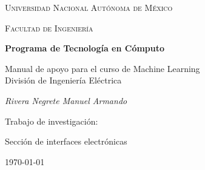 \begin{minipage}{\textwidth}
	\centering
	\vspace{1.5cm}
	\scshape\LARGE Universidad Nacional Autónoma de México \par
	\vspace{1cm}
	{\scshape\Large Facultad de Ingeniería\par}
	\vspace{0.5cm}
	{\huge\bfseries Programa de Tecnología en Cómputo\\} \vspace{0.5cm} \par 
	Manual de apoyo para el curso de Machine Learning
	\vspace{0.5cm}
	\\\large División de Ingeniería Eléctrica \\
	\vspace{1.5cm}
	{\Large\itshape 
		Rivera Negrete Manuel Armando
		\par}\vfill\vspace{0.35cm}
	\vfill	\vspace{1.25cm}	
	Trabajo de investigación:\par
	Sección de interfaces electrónicas
	\vfill
	\vspace{2.10cm}
	{\large \today\par}
	\thispagestyle{empty}
\end{minipage}
\newpage